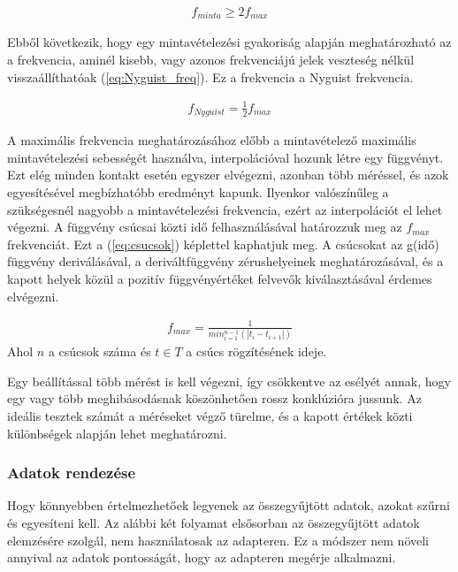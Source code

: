 \begin{align}
    f_{minta} \geq 2f_{max}
    \label{eq:Nyguist}
\end{align}	
\cite{por2019nyquist}

Ebből következik, hogy egy mintavételezési gyakoriság alapján meghatározható az a frekvencia, aminél kisebb, vagy azonos frekvenciájú jelek veszteség nélkül visszaállíthatóak (\ref{eq:Nyguist_freq}). Ez a frekvencia a Nyguist frekvencia.

\begin{align}
    f_{Nyguist} = \frac{1}{2}f_{max}
    \label{eq:Nyguist_freq}
\end{align}	
\cite{por2019nyquist}

A maximális frekvencia meghatározásához előbb a mintavételező maximális mintavételezési sebességét használva, interpolációval hozunk létre egy függvényt. Ezt elég minden kontakt esetén egyszer elvégezni, azonban több méréssel, és azok egyesítésével megbízhatóbb eredményt kapunk. Ilyenkor valószínűleg a szükségesnél nagyobb a mintavételezési frekvencia, ezért az interpolációt el lehet végezni. A függvény csúcsai közti idő felhasználásával határozzuk meg az $f_{max}$ frekvenciát. Ezt a (\ref{eq:csucsok}) képlettel kaphatjuk meg. A csúcsokat az g(idő) függvény deriválásával, a deriváltfüggvény zérushelyeinek meghatározásával, és a kapott helyek közül a pozitív függvényértéket felvevők kiválasztásával érdemes elvégezni.

\begin{align}
    f_{max} = \frac{1}{min^{n - 1}_{i = 1}(|t_{i} - t_{i + 1}|)}
    \label{eq:csucsok}
\end{align}	
\small Ahol $n$ a csúcsok száma és $t \in T$ a csúcs rögzítésének ideje.

Egy beállítással több mérést is kell végezni, így csökkentve az esélyét annak, hogy egy vagy több meghibásodásnak köszönhetően rossz konklúzióra jussunk. Az ideális tesztek számát a méréseket végző türelme, és a kapott értékek közti különbségek alapján lehet meghatározni.

\subsubsection{Adatok rendezése}
Hogy könnyebben értelmezhetőek legyenek az összegyűjtött adatok, azokat szűrni és egyesíteni kell. Az alábbi két folyamat elsősorban az összegyűjtött adatok elemzésére szolgál, nem használatosak az adapteren. Ez a módszer nem növeli annyival az adatok pontosságát, hogy az adapteren megérje alkalmazni.
